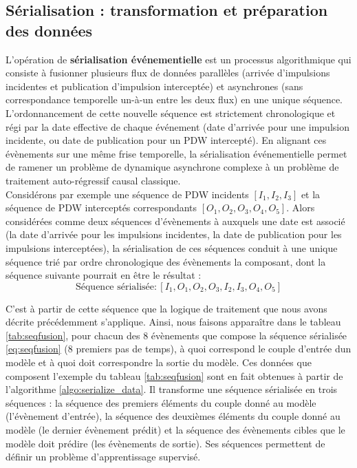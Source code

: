 \subsection{Sérialisation : transformation et préparation des données}
L'opération de \textbf{sérialisation événementielle} est un processus algorithmique qui consiste à fusionner plusieurs flux de données parallèles (arrivée d'impulsions incidentes et publication d'impulsion interceptée) et asynchrones (sans correspondance temporelle un-à-un entre les deux flux) en une unique séquence. L'ordonnancement de cette nouvelle séquence est strictement chronologique et régi par la date effective de chaque événement (date d'arrivée pour une impulsion incidente, ou date de publication pour un PDW intercepté). En alignant ces évènements sur une même frise temporelle, la sérialisation événementielle permet de ramener un problème de dynamique asynchrone complexe à un problème de traitement auto-régressif causal classique.\\

Considérons par exemple une séquence de PDW incidents $[I_1, I_2, I_3]$ et la séquence de PDW interceptés correspondants $[O_1, O_2, O_3, O_4, O_5]$. Alors considérées comme deux séquences d'évènements à auxquels une date est associé (la date d'arrivée pour les impulsions incidentes, la date de publication pour les impulsions interceptées), la sérialisation de ces séquences conduit à une unique séquence trié par ordre chronologique des évènements la composant, dont la séquence suivante pourrait en être le résultat :
\begin{equation}
\label{eq:seqfusion}
\text{Séquence sérialisée} : [I_1, O_1, O_2, O_3, I_2, I_3, O_4, O_5]
\end{equation}

C'est à partir de cette séquence que la logique de traitement que nous avons décrite précédemment s'applique. Ainsi, nous faisons apparaître dans le tableau \ref{tab:seqfusion}, pour chacun des 8 évènements que compose la séquence sérialisée \eqref{eq:seqfusion} (8 premiers pas de temps), à quoi correspond le couple d'entrée dun modèle et à quoi doit correspondre la sortie du modèle. Ces données que composent l'exemple du tableau \ref{tab:seqfusion} sont en fait obtenues à partir de l'algorithme \ref{algo:serialize_data}. Il transforme une séquence sérialisée en trois séquences : la séquence des premiers éléments du couple donné au modèle (l'évènement d'entrée), la séquence des deuxièmes éléments du couple donné au modèle (le dernier évènement prédit) et la  séquence des évènements cibles que le modèle doit prédire (les évènements de sortie). Ses séquences permettent de définir un problème d'apprentissage supervisé.

